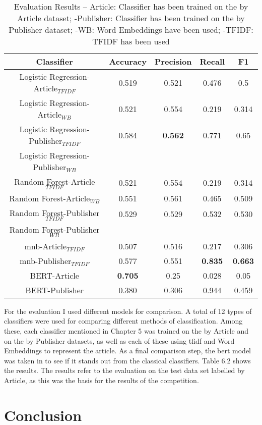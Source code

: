 \documentclass[a4paper, 11pt,titlepage,oneside,openany]{book}
\begin{document}
\begin{table}[h]
	\centering
	\begin{tabular}{c|c|c|c|c}
		\toprule
		Classifier & Accuracy & Precision & Recall &F1  \\
		\midrule
		Logistic Regression-Article$_{TFIDF}$ & 0.519 & 0.521 & 0.476 & 0.5 \\
		Logistic Regression-Article$_{WB}$ & 0.521 & 0.554 & 0.219 & 0.314 \\
		Logistic Regression-Publisher$_{TFIDF}$ & 0.584 & \textbf{0.562} & 0.771 & 0.65 \\
		Logistic Regression-Publisher$_{WB}$ &  &  &  &  \\
		Random Forest-Article$_{TFIDF}$ & 0.521 & 0.554 & 0.219 & 0.314 \\
		Random Forest-Article$_{WB}$ & 0.551 & 0.561 & 0.465 & 0.509 \\
		Random Forest-Publisher$_{TFIDF}$ & 0.529 & 0.529 & 0.532 & 0.530 \\
		Random Forest-Publisher$_{WB}$ &  &  &  &  \\
		\gls{mnb}-Article$_{TFIDF}$ & 0.507 & 0.516 & 0.217 & 0.306 \\
		\gls{mnb}-Publisher$_{TFIDF}$ & 0.577 & 0.551 & \textbf{0.835}  & \textbf{0.663} \\
		BERT-Article & \textbf{0.705} & 0.25 & 0.028 & 0.05 \\
		BERT-Publisher & 0.380 & 0.306 & 0.944 & 0.459 \\
		\bottomrule
	\end{tabular}
	\caption{Evaluation Results -- Article: Classifier has been trained on the by Article dataset; -Publisher: Classifier has been trained on the by Publisher dataset; -WB: Word Embeddings have been used; -TFIDF: TFIDF has been used}
\end{table}
For the evaluation I used different models for comparison. A total of 12 types of classifiers were used for comparing different methods of classification. Among these, each classifier mentioned in Chapter 5 was trained on the by Article and on the by Publisher datasets, as well as each of these using \gls{tfidf} and Word Embeddings to represent the article. As a final comparison step, the \gls{bert} model was taken in to see if it stands out from the classical classifiers. Table 6.2 shows the results. The results refer to the evaluation on the test data set labelled by Article, as this was the basis for the results of the competition. 
\chapter{Conclusion}
\end{document}
